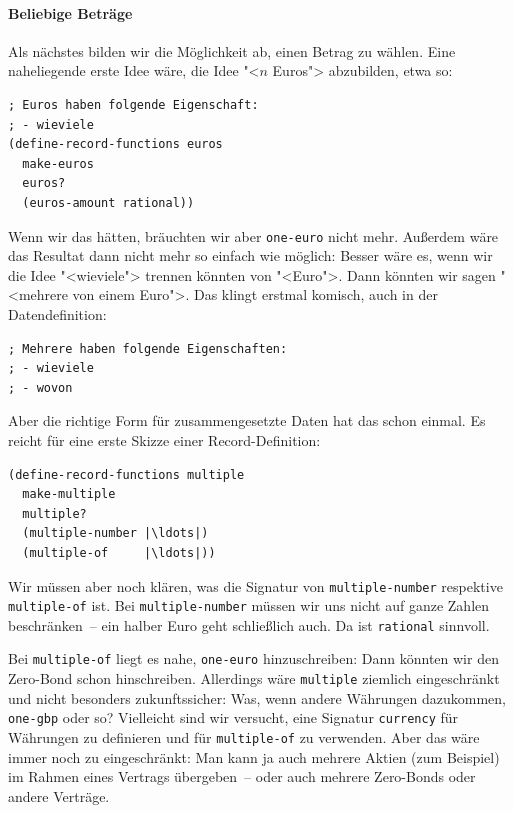 \paragraph{Beliebige Beträge}
Als nächstes bilden wir die Möglichkeit ab, einen Betrag zu wählen.
Eine naheliegende erste Idee wäre, die Idee "<$n$ Euros"> abzubilden,
etwa so:
%
\begin{lstlisting}
; Euros haben folgende Eigenschaft:
; - wieviele
(define-record-functions euros
  make-euros
  euros?
  (euros-amount rational))
\end{lstlisting}
%
Wenn wir das hätten, bräuchten wir aber \lstinline{one-euro} nicht mehr.
Außerdem wäre das Resultat dann nicht mehr so einfach wie möglich:
Besser wäre es, wenn wir die Idee "<wieviele"> trennen könnten von
"<Euro">.  Dann könnten wir sagen "<mehrere von einem Euro">.  Das
klingt erstmal komisch, auch in der Datendefinition:
%
\begin{lstlisting}
; Mehrere haben folgende Eigenschaften:
; - wieviele
; - wovon
\end{lstlisting}
%
Aber die richtige Form für zusammengesetzte Daten hat das schon
einmal.  Es reicht für eine erste Skizze einer Record-Definition:
%
\begin{lstlisting}
(define-record-functions multiple
  make-multiple
  multiple?
  (multiple-number |\ldots|)
  (multiple-of     |\ldots|))
\end{lstlisting}
%
Wir müssen aber noch klären, was die Signatur von
\lstinline{multiple-number} respektive \lstinline{multiple-of} ist.
Bei \lstinline{multiple-number} müssen wir uns nicht auf ganze Zahlen
beschränken~-- ein halber Euro geht schließlich auch.  Da ist
\lstinline{rational} sinnvoll.

Bei \lstinline{multiple-of} liegt es nahe, \lstinline{one-euro}
hinzuschreiben: Dann könnten wir den Zero-Bond schon hinschreiben.
Allerdings wäre \lstinline{multiple} ziemlich eingeschränkt und nicht
besonders zukunftssicher: Was, wenn andere Währungen dazukommen,
\lstinline{one-gbp} oder so?  Vielleicht sind wir versucht, eine
Signatur \lstinline{currency} für Währungen zu definieren und für
\lstinline{multiple-of} zu verwenden.  Aber das wäre immer noch zu
eingeschränkt: Man kann ja auch mehrere Aktien (zum Beispiel) im
Rahmen eines Vertrags übergeben~-- oder auch mehrere Zero-Bonds oder
andere Verträge.

